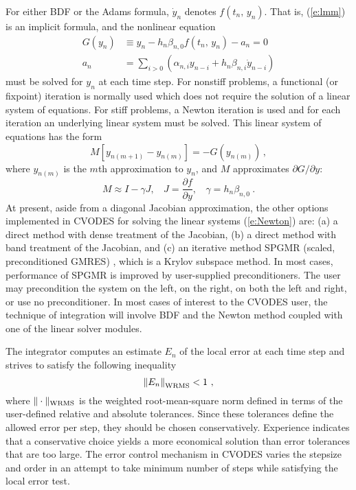 For either BDF or the Adams formula, $\dot{y}_n$ denotes
$f(t_n,\,y_n)$. That is, (\ref{e:lmm}) is an implicit formula, and 
the nonlinear equation 
\begin{equation}\label{e:nonlinear}
  \begin{split}
    G(y_n) &\equiv  y_n-h_n\beta_{n,0}f(t_n,\,y_n) - a_n=0   \\
    a_n &= \sum_{i>0}(\alpha_{n,i}y_{n-i}+h_n\beta_{n,i}\dot{y}_{n-i}) 
  \end{split}
\end{equation}
must be solved for $y_{n}$ at each time step. For nonstiff problems,
a functional (or fixpoint) iteration is normally used which does not
require the solution of a linear system of equations. For stiff
problems, a Newton iteration is used and for each iteration an
underlying linear system must be solved. This linear system of
equations has the form
\begin{equation}\label{e:Newton}
M[y_{n(m+1)}-y_{n(m)}]=-G(y_{n(m)}) \, ,
\end{equation}
where $y_{n(m)}$ is the $m$th approximation to $y_n$, and $M$
approximates $\partial G/ \partial y$:
\begin{equation} \label{e:N_Matrix}
M \approx I-\gamma J, ~~~~ J = \frac{\partial f}{\partial y}, ~~~~
    \gamma = h_n\beta_{n,0} ~.
\end{equation}
At present, aside from a diagonal Jacobian approximation, the other
options implemented in CVODES for solving the linear systems
(\ref{e:Newton}) are:
(a) a direct method with dense treatment of the Jacobian,
(b) a direct method with band treatment of the Jacobian, and
(c) an iterative method SPGMR (scaled, preconditioned
GMRES) \cite{BrHi:89}, which is a Krylov subspace method. In most
cases, performance of SPGMR is improved by user-supplied
preconditioners. The user may precondition the system on the left, on
the right, on both the left and right, or use no preconditioner.
In most cases of interest to the CVODES user, the technique of
integration will involve BDF and the Newton method coupled with one of the 
linear solver modules.

The integrator computes an estimate $E_{n}$ of the local error at each time
step and strives to satisfy the following inequality
\begin{equation*}
\left\| E_n\right\|_{\mbox{\scriptsize WRMS}} < 1 ~,
\end{equation*}
where $\|\cdot\|_{\mbox{\scriptsize WRMS}}$ is the weighted root-mean-square norm
defined in terms of the user-defined relative and absolute tolerances. 
Since these tolerances define the allowed error per step, they should be 
chosen conservatively. Experience indicates that a conservative choice yields 
a more economical solution than error tolerances that are too large.
The error control mechanism in CVODES varies the stepsize and order
in an attempt to take minimum number of steps while satisfying the local
error test. 

